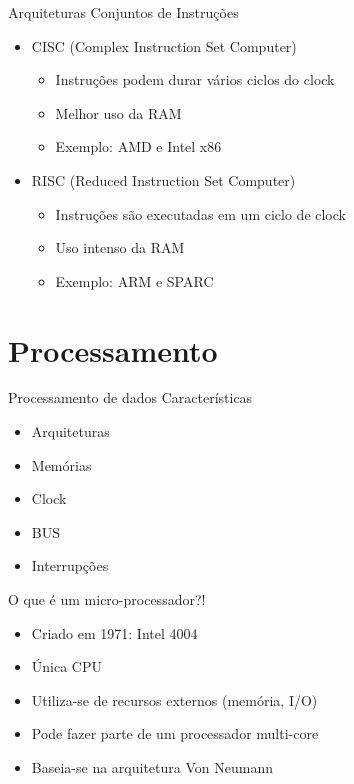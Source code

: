 \documentclass[t]{beamer}
\begin{document}
\begin{frame}{Arquiteturas}
	Conjuntos de Instruções
	\begin{itemize}
		\item CISC (Complex Instruction Set Computer)
		\begin{itemize}
			\item Instruções podem durar vários ciclos do clock
			\item Melhor uso da RAM
			\item Exemplo: AMD e Intel x86
		\end{itemize}
		\item RISC (Reduced Instruction Set Computer)
		\begin{itemize}
			\item Instruções são executadas em um ciclo de clock
			\item Uso intenso da RAM
			\item Exemplo: ARM e SPARC
		\end{itemize}
	\end{itemize}
\end{frame}

\section{Processamento}

\begin{frame}{Processamento de dados}
	Características
	\begin{itemize}
		\item Arquiteturas
		\item Memórias
		\item Clock
		\item BUS
		\item Interrupções
	\end{itemize}
\end{frame}

\begin{frame}{O que é um micro-processador?!}
	\begin{itemize}
		\item Criado em 1971: Intel 4004
		\item Única CPU
		\item Utiliza-se de recursos externos (memória, I/O)
		\item Pode fazer parte de um processador multi-core
		\item Baseia-se na arquitetura Von Neumann
	\end{itemize}
\end{frame}
\end{document}
